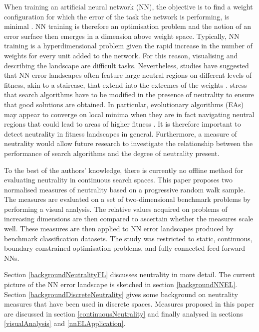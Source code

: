 \documentclass[conference]{IEEEtran}
\begin{document}
When training an artificial neural network (NN), the objective is to find a weight configuration for which the error of the task the network is performing, is minimal \cite{gallagher2000multi}. NN training is therefore an optimisation problem and the notion of an error surface then emerges in a dimension above weight space. Typically, NN training is a hyperdimensional problem given the rapid increase in the number of weights for every unit added to the network. For this reason, visualising and describing the landscape are difficult tasks. Nevertheless, studies have suggested that NN error landscapes often feature large neutral regions on different levels of fitness, akin to a staircase, that extend into the extremes of the weights \cite{gallagher2000multi,hush1992error}. \citet{owen2007adapting} stress that search algorithms have to be modified in the presence of neutrality to ensure that good solutions are obtained. In particular, evolutionary algorithms (EAs) may appear to converge on local minima when they are in fact navigating neutral regions that could lead to areas of higher fitness \cite{barnett2001netcrawling}. It is therefore important to detect neutrality in fitness landscapes in general. Furthermore, a measure of neutrality would allow future research to investigate the relationship between the performance of search algorithms and the degree of neutrality present. 

To the best of the authors' knowledge, there is currently no offline method for evaluating neutrality in continuous search spaces. This paper proposes two normalised measures of neutrality based on a progressive random walk sample. The measures are evaluated on a set of two-dimensional benchmark problems by performing a visual analysis. The relative values acquired on problems of increasing dimensions are then compared to ascertain whether the measures scale well. These measures are then applied to NN error landscapes produced by benchmark classification datasets. The study was restricted to static, continuous, boundary-constrained optimisation problems, and fully-connected feed-forward NNs.

Section \ref{backgroundNeutralityFL} discusses neutrality in more detail. The current picture of the NN error landscape is sketched in section \ref{backgroundNNEL}. Section \ref{backgroundDiscreteNeutrality} gives some background on neutrality measures that have been used in discrete spaces. Measures proposed in this paper are discussed in section \ref{continuousNeutrality} and finally analysed in sections \ref{visualAnalysis} and \ref{nnELApplication}.
\end{document}
